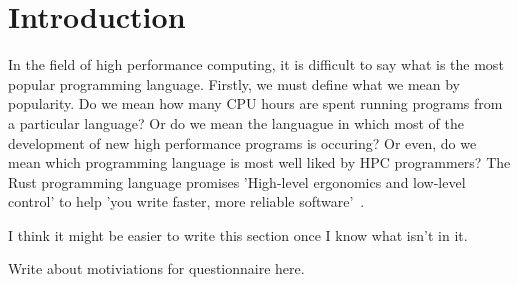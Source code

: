 \chapter{Introduction}
In the field of high performance computing, it is difficult to say what is the most popular programming language. Firstly, we must define what we mean by popularity. Do we mean how many CPU hours are spent running programs from a particular language? Or do we mean the languague in which most of the development of new high performance programs is occuring? Or even, do we mean which programming language is most well liked by HPC programmers?
The Rust programming language promises 'High-level ergonomics and low-level control' to help 'you write faster, more reliable software'~\cite{RustBook}.

I think it might be easier to write this section once I know what isn't in it.


Write about motiviations for questionnaire here.
